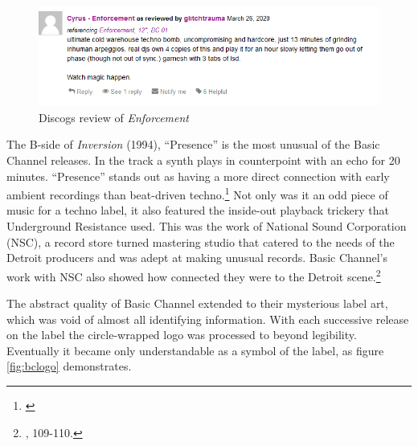 \documentclass[12pt,twoside]{reedthesis}
\begin{document}
\begin{figure}[htbp]
	\begin{centering}
		\includegraphics[width=5in]{./Images/enforcement_review}
		\caption{Discogs review of \emph{Enforcement}}
		\label{fig:enforcement}
	\end{centering}
\end{figure}

The B-side of \emph{Inversion} (1994), ``Presence'' is the most unusual of the Basic Channel releases. In the track a synth plays in counterpoint with an echo for 20 minutes. ``Presence'' stands out as having a more direct connection with early ambient recordings than beat-driven techno.\footnote{\cite{cyrusInversion1994}} Not only was it an odd piece of music for a techno label, it also featured the inside-out playback trickery that Underground Resistance used. This was the work of National Sound Corporation (NSC), a record store turned mastering studio that catered to the needs of the Detroit producers and was adept at making unusual records. Basic Channel's work with NSC also showed how connected they were to the Detroit scene.\footnote{\cite{sickoTechnoRebelsRenegades2010}, 109-110.}

The abstract quality of Basic Channel extended to their mysterious label art, which was void of almost all identifying information. With each successive release on the label the circle-wrapped logo was processed to beyond legibility. Eventually it became only understandable as a symbol of the label, as figure \ref{fig:bclogo} demonstrates.
\end{document}
